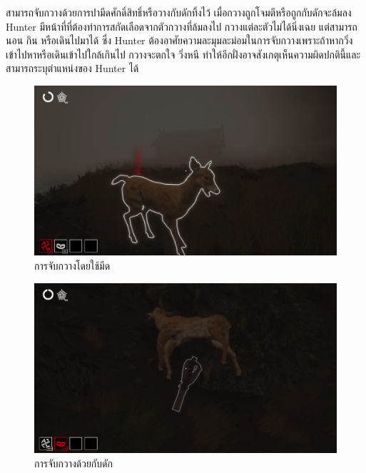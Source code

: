 สามารถจับกวางด้วยการปามีดศักดิ์สิทธิ์หรือวางกับดักทิ้งไว้ เมื่อกวางถูกโจมตีหรือถูกกับดักจะล้มลง Hunter มีหน้าที่ที่ต้องทำการสกัดเลือดจากตัวกวางที่ล้มลงไป
กวางแต่ละตัวไม่ได้นิ่งเฉย แต่สามารถนอน กิน หรือเดินไปมาได้ ซึ่ง
Hunter ต้องอาศัยความละมุมละม่อมในการจับกวางเพราะถ้าหากวิ่งเข้าไปหาหรือเดินเข้าไปใกล้เกินไป กวางจะตกใจ
วิ่งหนี ทำให้อีกฝั่งอาจสังเกตุเห็นความผิดปกตินี้และสามารถระบุตำแหน่งของ Hunter ได้

\begin{figure}[h]
  \begin{center}
  \includegraphics[width=\textwidth]{./img/mechanics/throw_knife_deer.png}
  \end{center}
    \caption[การจับกวางโดยใช้มีด]{การจับกวางโดยใช้มีด}
    \label{fig:การจับกวางโดยใช้มีด}
\end{figure}

\begin{figure}[p]
  \begin{center}
  \includegraphics[width=\textwidth]{./img/mechanics/deer_trapped.png}
  \end{center}
    \caption[การจับกวางด้วยกับดัก]{การจับกวางด้วยกับดัก}
    \label{การจับกวางด้วยกับดัก}
\end{figure}

